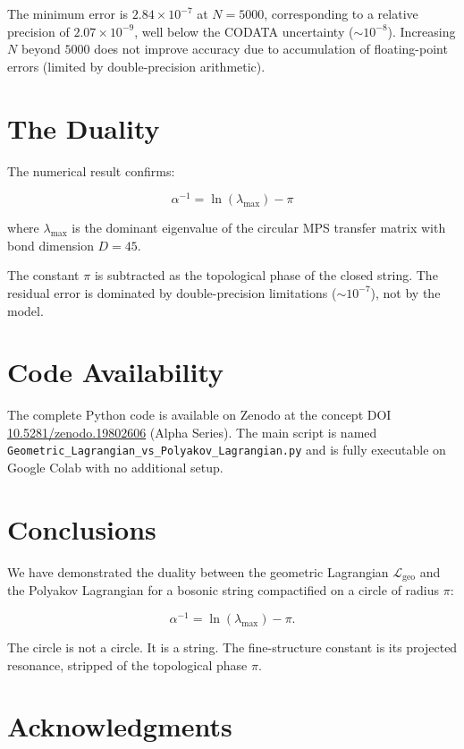 \documentclass[12pt]{article}
\begin{document}
The minimum error is $2.84\times10^{-7}$ at $N = 5000$, corresponding
to a relative precision of $2.07\times10^{-9}$, well below the CODATA
uncertainty ($\sim10^{-8}$). Increasing $N$ beyond $5000$ does not improve
accuracy due to accumulation of floating-point errors (limited by
double-precision arithmetic).

\section{The Duality}

The numerical result confirms:

\[
\boxed{\alpha^{-1} = \ln(\lambda_{\text{max}}) - \pi}
\]

where $\lambda_{\text{max}}$ is the dominant eigenvalue of the
circular MPS transfer matrix with bond dimension $D = 45$.

The constant $\pi$ is subtracted as the topological phase of the
closed string. The residual error is dominated by double-precision
limitations ($\sim10^{-7}$), not by the model.

\section{Code Availability}

The complete Python code is available on Zenodo at the concept DOI
\href{https://doi.org/10.5281/zenodo.19802606}{10.5281/zenodo.19802606}
(Alpha Series). The main script is named
\texttt{Geometric\_Lagrangian\_vs\_Polyakov\_Lagrangian.py} and is fully
executable on Google Colab with no additional setup.

\section{Conclusions}

We have demonstrated the duality between the geometric Lagrangian
$\mathcal{L}_{\text{geo}}$ and the Polyakov Lagrangian for a bosonic
string compactified on a circle of radius $\pi$:

\[
\alpha^{-1} = \ln(\lambda_{\text{max}}) - \pi.
\]

The circle is not a circle. It is a string. The fine-structure constant
is its projected resonance, stripped of the topological phase $\pi$.

\section*{Acknowledgments}
\end{document}
